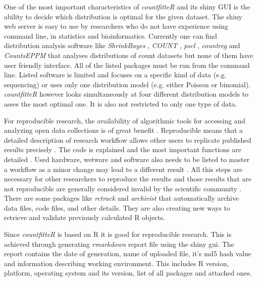 One of the most important characteristics of \emph{countfitteR} and its shiny GUI is the ability to  decide which distribution is optimal for the given dataset. The shiny web server is easy to use by researchers who do not have experience using command line, in statistics and bioinformatics. 
Currently one can find distribution analysis software like \emph{ShrinkBayes} \citep{shrinkbayes}, \emph{COUNT} \citep{COUNT}, \emph{pscl} \citep{pscl}, \emph{countreg} \citep{countreg} and \emph{CountsEPPM} \citep{countseppm} that analyses distributions of count datasets but none of them have user friendly interface. All of the listed packages must be run from the command line. 
Listed software is limited and focuses on a specific kind of data (e.g. sequencing) or uses only one distribution model (e.g. either Poisson or binomial). \emph{countfitteR} however looks simultaneously at four different distribution models to asses the most optimal one. It is also not restricted to only one type of data. 

For reproducible research, the availability of algorithmic tools for accessing and analyzing open data collections is of great benefit \cite{lahti_retrieval_2017}. Reproducible means that a detailed description of research workflow allows other users to replicate published results precisely \citep{leeper_archiving_2014}. The code is explained and the most important functions are detailed \citep{thioulouse_online_2010}. 
Used hardware, wetware and software also needs to be listed to master a workflow as a minor change may lead to a different result \citep{rodiger_r_2015}. 
All this steps are necessary for other researchers to reproduce the results and those results that are not reproducible are generally considered invalid by the scientific community \citep{rodiger_r_2015}.
There are some packages like \emph{rctrack} \citep{liu_r_2014} and \emph{archivist} \citep{Biecek_2017} that automatically archive data files, code files, and other details. They are also creating new ways to retrieve and validate previously calculated R objects. 

Since \emph{countfitteR} is based on R it is good for reproducible research. This is achieved through generating \emph{rmarkdown} \citep{rmarkdown} report file using the shiny gui. The report contains the date of generation, name of uploaded file, it's md5 hash value and information describing working environment. This includes R version, platform, operating system and its version, list of all packages and attached ones.

